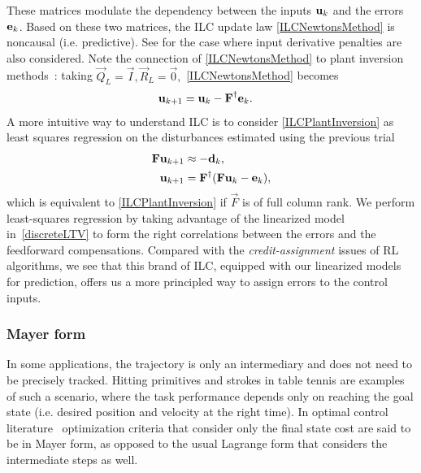 %
\noindent These matrices modulate the dependency between the inputs $\boldsymbol{\mathrm{u}}_k$ and the errors $\boldsymbol{\mathrm{e}}_k$. Based on these two matrices, the ILC update law \eqref{ILCNewtonsMethod} is noncausal (i.e. predictive). See \cite{Amann95,Gunnarsson01} for the case where input derivative penalties are also considered. Note the connection of \eqref{ILCNewtonsMethod} to plant inversion methods~\cite{Bristow06}: taking $\vec{Q}_L = \vec{I}, \vec{R}_{L} = \vec{0},$ \eqref{ILCNewtonsMethod} becomes
%
\begin{equation}
\begin{aligned}
\boldsymbol{\mathrm{u}}_{k+1} &= \boldsymbol{\mathrm{u}}_k - \boldsymbol{\mathrm{F}}^{\dagger}\boldsymbol{\mathrm{e}}_k.
\end{aligned}
\label{ILCPlantInversion}
\end{equation}
%
%
\noindent A more intuitive way to understand ILC is to consider \eqref{ILCPlantInversion} as least squares regression on the disturbances estimated using the previous trial
%
\begin{equation}
\begin{aligned}
\boldsymbol{\mathrm{F}}\boldsymbol{\mathrm{u}}_{k+1} &\approx -\boldsymbol{\mathrm{d}}_{k},\\
\boldsymbol{\mathrm{u}}_{k+1} &= \boldsymbol{\mathrm{F}}^{\dagger}(\boldsymbol{\mathrm{F}}\boldsymbol{\mathrm{u}}_{k} - \boldsymbol{\mathrm{e}}_k),
\end{aligned}
\label{ILCasRegression}
\end{equation}
%
\noindent which is equivalent to \eqref{ILCPlantInversion} if $\vec{F}$ is of full column rank. We perform least-squares regression by taking advantage of the linearized model in~\eqref{discreteLTV} to form the right correlations between the errors and the feedforward compensations. Compared with the \emph{credit-assignment} issues of RL algorithms, we see that this brand of ILC, equipped with our linearized models for prediction, offers us a more principled way to assign errors to the control inputs.

\subsubsection{Mayer form}

In some applications, the trajectory is only an intermediary and does not need to be precisely tracked. Hitting primitives and strokes in table tennis are examples of such a scenario, where the task performance depends only on reaching the goal state (i.e. desired position and velocity at the right time). In optimal control literature~\cite{Liberzon11} optimization criteria that consider only the final state cost are said to be in Mayer form, as opposed to the usual Lagrange form that considers the intermediate steps as well.

